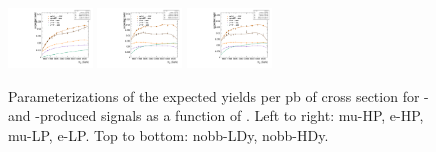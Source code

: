 \begin{figure}[htbp]
  \includegraphics[width=0.2\textwidth]{fig/2Dfit/paramSignalYield_NonVBFSig_e_HP_nobb_HDy.pdf}
  \includegraphics[width=0.2\textwidth]{fig/2Dfit/paramSignalYield_NonVBFSig_mu_LP_nobb_HDy.pdf}
  \includegraphics[width=0.2\textwidth]{fig/2Dfit/paramSignalYield_NonVBFSig_e_LP_nobb_HDy.pdf}\\
  \caption{
    Parameterizations of the expected yields per pb of cross section for \ggF- and \DY-produced signals as a function of \MX.
    Left to right: mu-HP, e-HP, mu-LP, e-LP.
    Top to bottom: nobb-LDy, nobb-HDy.
  }
  \label{fig:YieldParam_NonVBF_Run2}
\end{figure}

